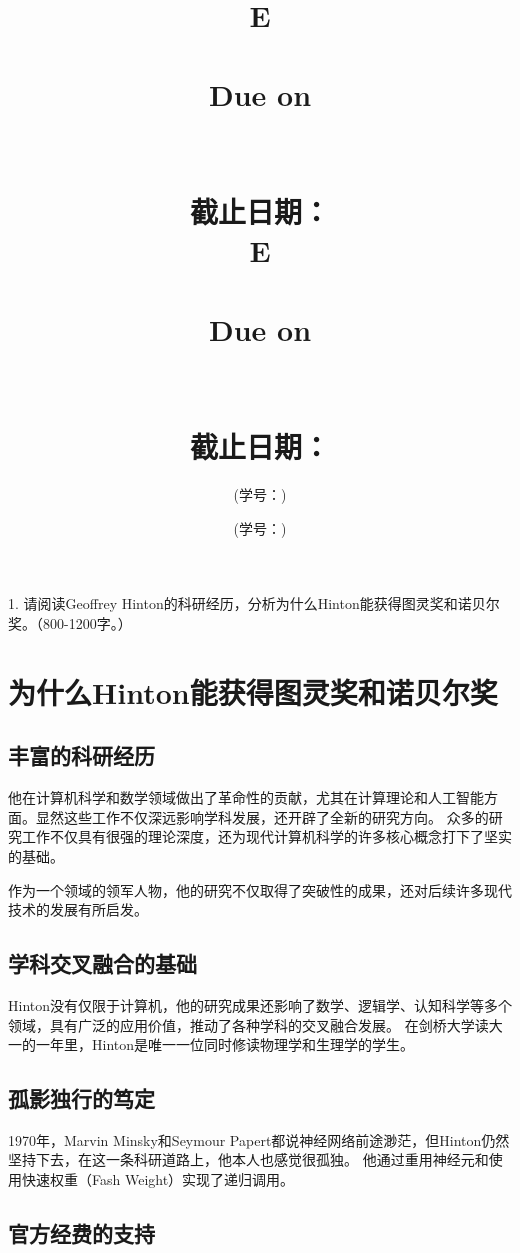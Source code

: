 \documentclass[UTF8]{homework}
\date{} %
\title{
        \vspace{3in}
        \if\hmwkLanguage E
            \huge{\textbf{\hmwkClass}}\\
            \vspace{0.4in}
            \huge{\textbf{\hmwkTitle}}\\
            \vspace{0.4in}
            \normalsize{Due on \hmwkDueDate}\\
        \else
            \Huge{\textbf{\hmwkClassCN}}\\
            \vspace{0.3in}
            \Huge{\textbf{\hmwkTitleCN}}\\
            \vspace{0.4in}
            \normalsize{截止日期：\hmwkDueDateCN}\\
        \fi
        \vspace{2.4in}
    }
\author{\hmwkAuthorName}
\author{\hmwkAuthorNameCN (学号：\hmwkAuthorIDCN)}
\date{}
\title{
        \if\hmwkLanguage E
            \huge{\textbf{\hmwkClass}}\\
            \vspace{0.05in}
            \huge{\textbf{\hmwkTitle}}\\
            \vspace{0.2in}
            \normalsize{Due on \hmwkDueDate}\\
        \else
            \Huge{\textbf{\hmwkClassCN}}\\
            \vspace{0.05in}
            \Huge{\textbf{\hmwkTitleCN}}\\
            \vspace{0.2in}
            \normalsize{截止日期：\hmwkDueDateCN}\\
        \fi
    }
\author{\hmwkAuthorName}
\author{\hmwkAuthorNameCN (学号：\hmwkAuthorIDCN)}
\date{}
\begin{document}
\maketitle
\if{}
    \pagebreak
\fi


%
%
\begin{homeworkProblem}

1. 请阅读Geoffrey Hinton的科研经历，分析为什么Hinton能获得图灵奖和诺贝尔奖。（800-1200字。）    

\solution

\section{为什么Hinton能获得图灵奖和诺贝尔奖}

\subsection{丰富的科研经历}

他在计算机科学和数学领域做出了革命性的贡献，尤其在计算理论和人工智能方面。显然这些工作不仅深远影响学科发展，还开辟了全新的研究方向。
众多的研究工作不仅具有很强的理论深度，还为现代计算机科学的许多核心概念打下了坚实的基础。

作为一个领域的领军人物，他的研究不仅取得了突破性的成果，还对后续许多现代技术的发展有所启发。

\subsection{学科交叉融合的基础}

Hinton没有仅限于计算机，他的研究成果还影响了数学、逻辑学、认知科学等多个领域，具有广泛的应用价值，推动了各种学科的交叉融合发展。
在剑桥大学读大一的一年里，Hinton是唯一一位同时修读物理学和生理学的学生。

\subsection{孤影独行的笃定}

1970年，Marvin Minsky和Seymour Papert都说神经网络前途渺茫，但Hinton仍然坚持下去，在这一条科研道路上，他本人也感觉很孤独。
他通过重用神经元和使用快速权重（Fash Weight）实现了递归调用。

\subsection{官方经费的支持}


\end{homeworkProblem}
\end{document}

